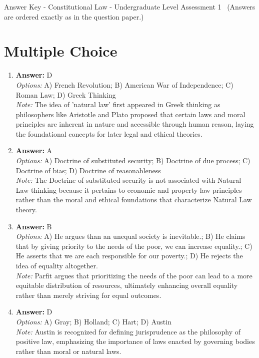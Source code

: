 \documentclass[12pt]{article}
\begin{document}
\begin{center}
Answer Key - Constitutional Law - Undergraduate Level Assessment 1 \
\small (Answers are ordered exactly as in the question paper.)
\end{center}

\section*{Multiple Choice}
\begin{enumerate}[label=\arabic*.]
\item \textbf{Answer:} D
\\ \textit{Options:} A) French Revolution; B) American War of Independence; C) Roman Law; D) Greek Thinking
\\ \textit{Note:} The idea of 'natural law' first appeared in Greek thinking as philosophers like Aristotle and Plato proposed that certain laws and moral principles are inherent in nature and accessible through human reason, laying the foundational concepts for later legal and ethical theories.
\item \textbf{Answer:} A
\\ \textit{Options:} A) Doctrine of substituted security; B) Doctrine of due process; C) Doctrine of bias; D) Doctrine of reasonableness
\\ \textit{Note:} The Doctrine of substituted security is not associated with Natural Law thinking because it pertains to economic and property law principles rather than the moral and ethical foundations that characterize Natural Law theory.
\item \textbf{Answer:} B
\\ \textit{Options:} A) He argues than an unequal society is inevitable.; B) He claims that by giving priority to the needs of the poor, we can increase equality.; C) He asserts that we are each responsible for our poverty.; D) He rejects the idea of equality altogether.
\\ \textit{Note:} Parfit argues that prioritizing the needs of the poor can lead to a more equitable distribution of resources, ultimately enhancing overall equality rather than merely striving for equal outcomes.
\item \textbf{Answer:} D
\\ \textit{Options:} A) Gray; B) Holland; C) Hart; D) Austin
\\ \textit{Note:} Austin is recognized for defining jurisprudence as the philosophy of positive law, emphasizing the importance of laws enacted by governing bodies rather than moral or natural laws.

\end{enumerate}
\end{document}
